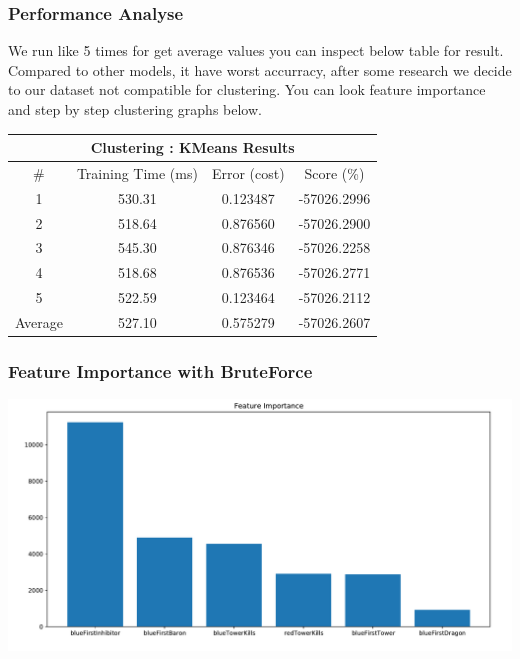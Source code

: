 \documentclass[a4paper]{article}
\begin{document}
\subsubsection{Performance Analyse}

We run like 5 times  for get average values you can inspect below table for result. Compared to other models, it have worst accurracy, after some research we decide to our dataset not compatible for clustering. You can look feature importance and step by step clustering graphs below.



\begin{table}[H]
\centering
\begin{tabular}{|cccc|}
\hline
\multicolumn{4}{|c|}{\textbf{Clustering : KMeans Results}} \\ \hline
\#       & Training Time (ms) & Error (cost) & Score (\%)  \\ \hline
1        & 530.31             & 0.123487     & -57026.2996 \\
2        & 518.64             & 0.876560     & -57026.2900 \\
3        & 545.30             & 0.876346     & -57026.2258 \\
4        & 518.68             & 0.876536     & -57026.2771 \\
5        & 522.59             & 0.123464     & -57026.2112 \\ \hline
Average  & 527.10             & 0.575279     & -57026.2607 \\ \hline
\end{tabular}
\end{table}

\subsubsection{Feature Importance with BruteForce}
\includegraphics[width=.9\linewidth]{graphs/kmeans_feature_importance.pdf}
\end{document}
